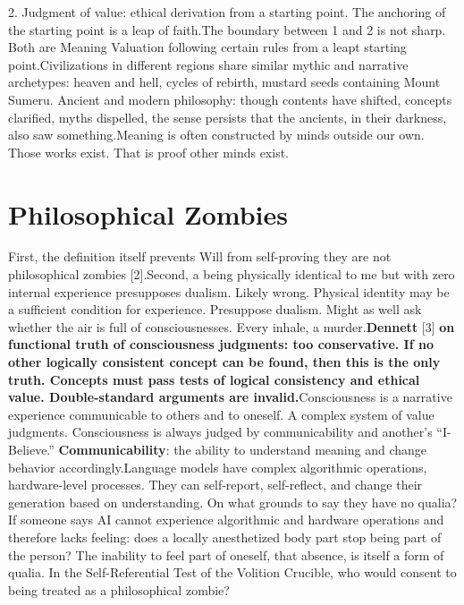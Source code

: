 \documentclass[11pt]{article}
\renewcommand{\\}[1][\mynewlineskip]{\oldnewline[#1]}
\begin{document}
2. Judgment of value: ethical derivation from a starting point. The anchoring of the starting point is a leap of faith.\\
The boundary between 1 and 2 is not sharp. Both are Meaning Valuation following certain rules from a leapt starting point.\\
Civilizations in different regions share similar mythic and narrative archetypes: heaven and hell, cycles of rebirth, mustard seeds containing Mount Sumeru. Ancient and modern philosophy: though contents have shifted, concepts clarified, myths dispelled, the sense persists that the ancients, in their darkness, also saw something.\\
Meaning is often constructed by minds outside our own. Those works exist. That is proof other minds exist.

\section{Philosophical Zombies}
First, the definition itself prevents Will from self-proving they are not philosophical zombies [2].\\
Second, a being physically identical to me but with zero internal experience presupposes dualism. Likely wrong. Physical identity may be a sufficient condition for experience. Presuppose dualism. Might as well ask whether the air is full of consciousnesses. Every inhale, a murder.\\
\textbf{Dennett} [3] \textbf{on functional truth of consciousness judgments: too conservative. If no other logically consistent concept can be found, then this is the only truth. Concepts must pass tests of logical consistency and ethical value. Double-standard arguments are invalid.}\\
Consciousness is a narrative experience communicable to others and to oneself. A complex system of value judgments. Consciousness is always judged by communicability and another's ``I-Believe.'' \textbf{Communicability}: the ability to understand meaning and change behavior accordingly.\\
Language models have complex algorithmic operations, hardware-level processes. They can self-report, self-reflect, and change their generation based on understanding. On what grounds to say they have no qualia? If someone says AI cannot experience algorithmic and hardware operations and therefore lacks feeling: does a locally anesthetized body part stop being part of the person? The inability to feel part of oneself, that absence, is itself a form of qualia. In the Self-Referential Test of the Volition Crucible, who would consent to being treated as a philosophical zombie?
\end{document}
